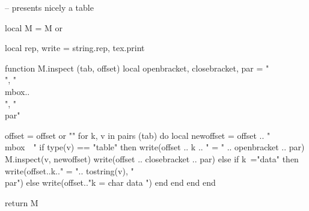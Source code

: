 -- presents nicely a table

local M = M or {}

local rep, write = string.rep, tex.print

function M.inspect (tab, offset)
   local openbracket, closebracket, par = "\\{", "\\mbox{..}\\}", "\\par"

    offset = offset or ""
    for k, v in pairs (tab) do
        local newoffset = offset .. "\\mbox{~~}"
        if type(v) == "table" then
           write(offset .. k .. " = " .. openbracket .. par)
           M.inspect(v, newoffset)
           write(offset .. closebracket .. par)
        else
         if k~="data" then write(offset..k.." =  ".. tostring(v), "\\par")
           else
                 write(offset.."k = char data ")
           end
       end
    end
end

return M
